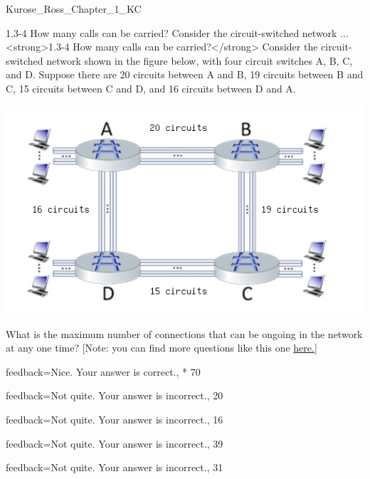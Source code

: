 \documentclass[a4paper]{article}
\begin{document}
\begin{quiz}{Kurose_Ross_Chapter_1_KC}
\begin{multi}[
	points=1,
	penalty=0.33333,
]{1.3-4 How many calls can be carried? Consider the circuit-switched network ...}
<strong>1.3-4 How many calls can be carried?</strong> Consider the circuit-switched network shown in the figure below, with  four circuit switches A, B, C, and D. Suppose there are 20 circuits between A and B, 19 circuits between B and C, 15 circuits between C and D, and 16 circuits between D and A. 
\begin{center}
\includegraphics[width=\linewidth]{figs/1.3.4.png}
\end{center}
 What is the maximum number of connections that can be ongoing in the network at any one time? [Note: you can find more questions like this one \href{http://gaia.cs.umass.edu/kurose_ross/interactive/circuit_switching.php}{here.]}
\item[feedback={Nice. Your answer is correct.},]* 70
\item[feedback={Not quite. Your answer is incorrect.},] 20
\item[feedback={Not quite. Your answer is incorrect.},] 16
\item[feedback={Not quite. Your answer is incorrect.},] 39
\item[feedback={Not quite. Your answer is incorrect.},] 31
\end{multi}


\end{quiz}
\end{document}
